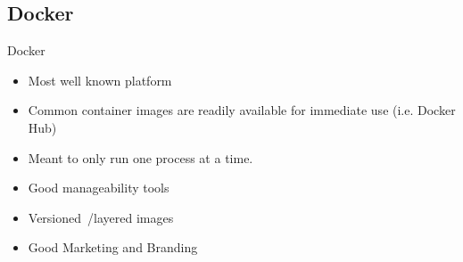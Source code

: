 \subsection{Docker}
\begin{frame}[fragile]{Docker}

\begin{itemize}
\item Most well known platform
\item \color{cobalt}Common container images are readily available for immediate use (i.e. Docker Hub)
\item \color{black}Meant to only run one process at a time.
\item Good manageability tools
\item Versioned~/layered images
\item \color{cobalt} Good Marketing and Branding
\end{itemize}

\end{frame}